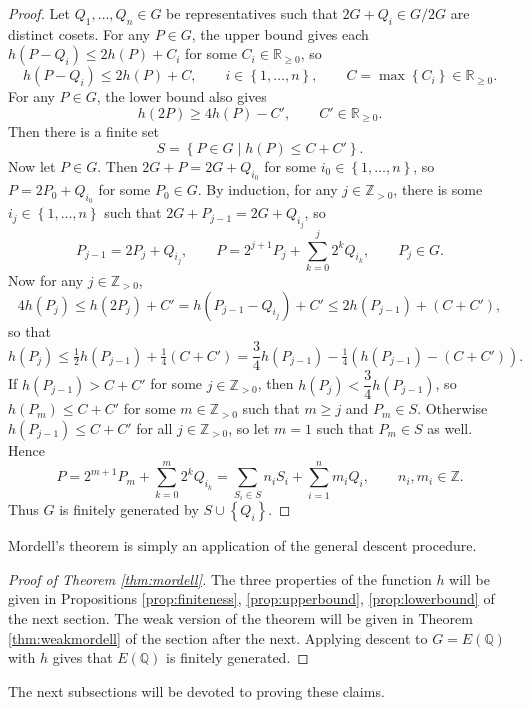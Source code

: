 \documentclass{article}
\newcommand{\Z}{\mathbb{Z}}
\newcommand{\Q}{\mathbb{Q}}
\newcommand{\R}{\mathbb{R}}
\newcommand{\rb}[1]{\left( #1 \right)}
\newcommand{\cb}[1]{\left\{ #1 \right\}}
\theoremstyle{definition}\newtheorem*{definition}{Definition}
\theoremstyle{definition}\newtheorem*{example}{Example}
\theoremstyle{definition}\newtheorem*{remark}{Remark}
\begin{document}
\begin{proof}
Let $ Q_1, \dots, Q_n \in G $ be representatives such that $ 2G + Q_i \in G / 2G $ are distinct cosets. For any $ P \in G $, the upper bound gives each $ h\rb{P - Q_i} \le 2h\rb{P} + C_i $ for some $ C_i \in \R_{\ge 0} $, so
$$ h\rb{P - Q_i} \le 2h\rb{P} + C, \qquad i \in \cb{1, \dots, n}, \qquad C = \max\cb{C_i} \in \R_{\ge 0}. $$
For any $ P \in G $, the lower bound also gives
$$ h\rb{2P} \ge 4h\rb{P} - C', \qquad C' \in \R_{\ge 0}. $$
Then there is a finite set
$$ S = \cb{P \in G \mid h\rb{P} \le C + C'}. $$
Now let $ P \in G $. Then $ 2G + P = 2G + Q_{i_0} $ for some $ i_0 \in \cb{1, \dots, n} $, so $ P = 2P_0 + Q_{i_0} $ for some $ P_0 \in G $. By induction, for any $ j \in \Z_{> 0} $, there is some $ i_j \in \cb{1, \dots, n} $ such that $ 2G + P_{j - 1} = 2G + Q_{i_j} $, so
$$ P_{j - 1} = 2P_j + Q_{i_j}, \qquad P = 2^{j + 1}P_j + \sum_{k = 0}^j 2^kQ_{i_k}, \qquad P_j \in G. $$
Now for any $ j \in \Z_{> 0} $,
$$ 4h\rb{P_j} \le h\rb{2P_j} + C' = h\rb{P_{j - 1} - Q_{i_j}} + C' \le 2h\rb{P_{j - 1}} + \rb{C + C'}, $$
so that
$$ h\rb{P_j} \le \tfrac{1}{2}h\rb{P_{j - 1}} + \tfrac{1}{4}\rb{C + C'} = \dfrac{3}{4}h\rb{P_{j - 1}} - \tfrac{1}{4}\rb{h\rb{P_{j - 1}} - \rb{C + C'}}. $$
If $ h\rb{P_{j - 1}} > C + C' $ for some $ j \in \Z_{> 0} $, then $ h\rb{P_j} < \dfrac{3}{4}h\rb{P_{j - 1}} $, so $ h\rb{P_m} \le C + C' $ for some $ m \in \Z_{> 0} $ such that $ m \ge j $ and $ P_m \in S $. Otherwise $ h\rb{P_{j - 1}} \le C + C' $ for all $ j \in \Z_{> 0} $, so let $ m = 1 $ such that $ P_m \in S $ as well. Hence
$$ P = 2^{m + 1}P_m + \sum_{k = 0}^m 2^kQ_{i_k} = \sum_{S_i \in S} n_iS_i + \sum_{i = 1}^n m_iQ_i, \qquad n_i, m_i \in \Z. $$
Thus $ G $ is finitely generated by $ S \cup \cb{Q_i} $.
\end{proof}

Mordell's theorem is simply an application of the general descent procedure.

\begin{proof}[Proof of Theorem \ref{thm:mordell}]
The three properties of the function $ h $ will be given in Propositions \ref{prop:finiteness}, \ref{prop:upperbound}, \ref{prop:lowerbound} of the next section. The weak version of the theorem will be given in Theorem \ref{thm:weakmordell} of the section after the next. Applying descent to $ G = E\rb{\Q} $ with $ h $ gives that $ E\rb{\Q} $ is finitely generated.
\end{proof}

The next subsections will be devoted to proving these claims.
\end{document}
